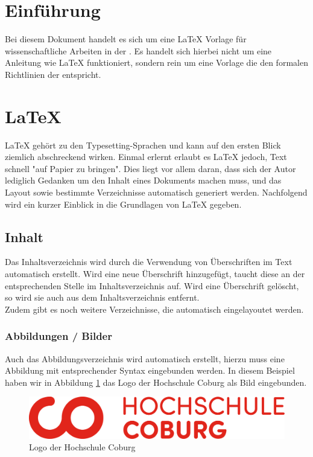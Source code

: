 \section{Einführung}
\label{sec:einfuehrung}

Bei diesem Dokument handelt es sich um eine \LaTeX{} Vorlage für wissenschaftliche Arbeiten in der . Es handelt sich hierbei nicht um eine Anleitung wie \LaTeX{} funktioniert, sondern rein um eine Vorlage die den formalen Richtlinien der  entspricht.

\newpage
\section{\LaTeX}

\LaTeX{} gehört zu den Typesetting-Sprachen und kann auf den ersten Blick ziemlich abschreckend wirken.
Einmal erlernt erlaubt es \LaTeX{} jedoch, Text schnell "auf Papier zu bringen". Dies liegt vor allem daran,
dass sich der Autor lediglich Gedanken um den Inhalt eines Dokuments machen muss, und das Layout sowie
bestimmte Verzeichnisse automatisch generiert werden. Nachfolgend wird ein kurzer Einblick in die Grundlagen
von \LaTeX{} gegeben.

\subsection{Inhalt}

Das Inhaltsverzeichnis wird durch die Verwendung von Überschriften im Text automatisch erstellt.
Wird eine neue Überschrift hinzugefügt, taucht diese an der entsprechenden Stelle im Inhaltsverzeichnis auf.
Wird eine Überschrift gelöscht, so wird sie auch aus dem Inhaltsverzeichnis entfernt. \\

Zudem gibt es noch weitere Verzeichnisse, die automatisch eingelayoutet werden.

\subsubsection{Abbildungen / Bilder}

Auch das Abbildungsverzeichnis wird automatisch erstellt, hierzu muss eine Abbildung mit
entsprechender Syntax eingebunden werden. In diesem Beispiel haben wir in Abbildung
\ref{fig: Logo der Hochschule Coburg} das Logo der Hochschule Coburg als Bild eingebunden.

\begin{figure}[H]
  \centering
  \includegraphics[width=\textwidth]{framework/Logo_HS_Coburg}
  \caption{Logo der Hochschule Coburg}
  \label{fig: Logo der Hochschule Coburg}
\end{figure}

